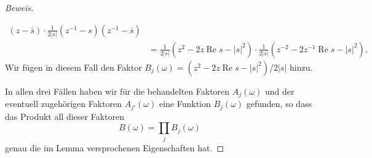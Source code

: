 \begin{proof}[Beweis]
\begin{enumerate}
\begin{align*}
(z-\bar{s})
\cdot
\frac1{2|s|}
(z^{-1}-s)
(z^{-1}-\bar{s})
\\
&=
\frac1{2|s|}(z^2-2z\operatorname{Re}s -|s|^2)
\cdot
\frac1{2|s|}(z^{-2}-2z^{-1}\operatorname{Re}s -|s|^2).
\end{align*}
Wir fügen in diesem Fall den Faktor $B_j(\omega)=(z^2-2z\operatorname{Re}s-|s|^2)/2|s|$ hinzu.
\end{enumerate}
In allen drei Fällen haben wir für die behandelten Faktoren $A_j(\omega)$
und der eventuell zugehörigen Faktoren $A_{j'}(\omega)$ eine Funktion
$B_j(\omega)$ gefunden, so dass das Produkt all dieser Faktoren
\[
B(\omega) = \prod_j B_j(\omega)
\]
genau die im Lemma versprochenen Eigenschaften hat.
\end{proof}

